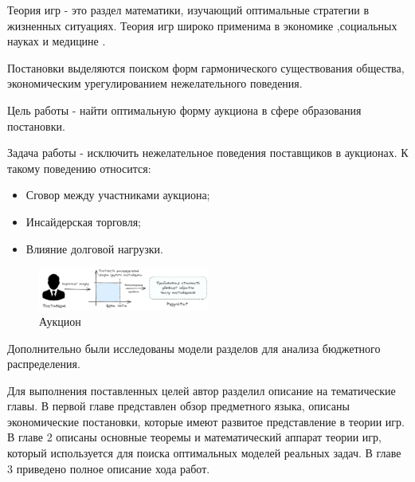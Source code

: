 Теория игр - это раздел математики, изучающий оптимальные стратегии в жизненных ситуациях. Теория игр широко применима в экономике \cite{baron1989bargaining},социальных науках \cite{arrow2012social} и медицине \cite{segev2005kidney}.


Постановки выделяются поиском форм гармонического существования общества, экономическим урегулированием нежелательного поведения.

Цель работы - найти оптимальную форму аукциона в сфере образования постановки. 

Задача работы - исключить нежелательное поведения поставщиков в аукционах. К такому поведению относится:
\begin{itemize}
    \item Сговор между участниками аукциона;
    \item Инсайдерская торговля;
    \item Влияние долговой нагрузки.
\end{itemize}


\begin{figure}[h]
    \centering
    \includegraphics[width=0.5\textwidth]{assets/settings/auction_goal.excalidraw.png}
    \caption{Аукцион}
\end{figure}

Дополнительно были исследованы модели разделов для анализа бюджетного распределения.

Для выполнения поставленных целей автор разделил описание на тематические главы. В первой главе представлен обзор предметного языка, описаны экономические постановки, которые имеют развитое представление в теории игр.
В главе 2 описаны основные теоремы и математический аппарат теории игр, который используется для поиска оптимальных моделей реальных задач. В главе 3 приведено полное описание хода работ.

 
 



 